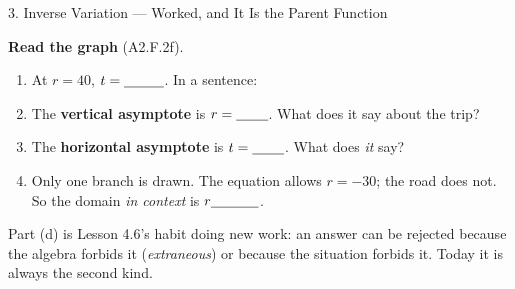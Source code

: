 \documentclass[10pt]{article}
\begin{document}
\begin{notesbox}{3. Inverse Variation --- Worked, and It Is the Parent Function}
\vspace{4pt}
\begin{center}
\begin{minipage}{0.42\linewidth}\centering
{}
\end{minipage}\hfill
\begin{minipage}{0.54\linewidth}
\small
\textbf{Read the graph} (A2.F.2f).
\begin{enumerate}[label=(\alph*), leftmargin=1.9em, itemsep=4pt]
  \item At $r=40$, $t=\blank{1.0cm}$. In a sentence: \blank{4.6cm}
  \item The \textbf{vertical asymptote} is $r=\blank{0.8cm}$. What does it say about the trip?
        \blank{4.6cm}
  \item The \textbf{horizontal asymptote} is $t=\blank{0.8cm}$. What does \emph{it} say?
        \blank{4.6cm}
  \item Only one branch is drawn. The equation allows $r=-30$; the road does not. So the domain
        \emph{in context} is $r\blank{1.2cm}$.
\end{enumerate}
\end{minipage}
\end{center}

\vspace{2pt}
{\small Part (d) is Lesson 4.6's habit doing new work: an answer can be rejected because the algebra
forbids it (\emph{extraneous}) or because the situation forbids it. Today it is always the second kind.}
\end{notesbox}
\end{document}
